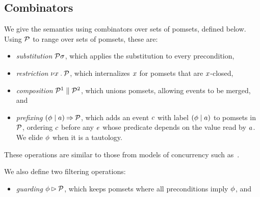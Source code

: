 \subsection{Combinators}
\label{sec:combinators}
We give the semantics using combinators over sets of pomsets, defined below.
Using $\mathcal{P}$ to range over sets of pomsets, these are:
\begin{itemize}
\item \emph{substitution} $\mathcal{P}\sigma$, which applies the substitution to
  every precondition,
\item \emph{restriction} $\nu x\mathbin.\mathcal{P}$, which internalizes $x$ for
  pomsets that are $x$-closed,
\item \emph{composition} $\mathcal{P}^1\parallel\mathcal{P}^2$, which unions pomsets, allowing events to be merged, and
\item \emph{prefixing} $(\phi \mid a)\mathbin\Rightarrow\mathcal{P}$, which adds an event $c$ with label
  $(\phi \mid a)$ to pomsets in $\mathcal{P}$, ordering $c$ before any $e$ whose predicate
  depends on the value read by $a$. We elide $\phi$ when it is a tautology.
\end{itemize}
These operations are similar to those from models of concurrency such
as~\cite{Brookes:1984:TCS:828.833}.

We also define two filtering operations:
\begin{itemize}
\item \emph{guarding} $\phi\mathbin\rhd\mathcal{P}$, which
  keeps pomsets where all preconditions imply $\phi$, and
\end{itemize}


